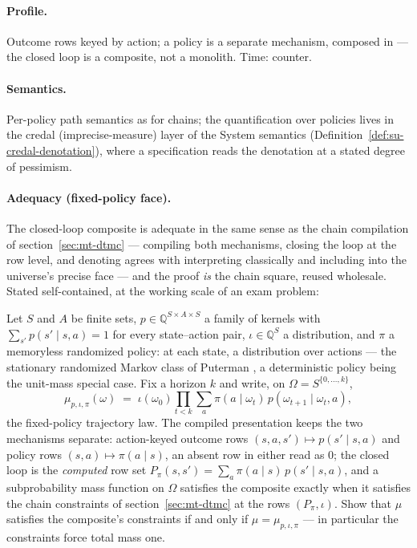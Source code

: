\paragraph{Profile.} Outcome rows keyed by action; a policy is a
separate mechanism, composed in --- the closed loop is a composite,
not a monolith. Time: counter.

\paragraph{Semantics.} Per-policy path semantics as for chains; the
quantification over policies lives in the credal (imprecise-measure)
layer of the System semantics
(Definition~\ref{def:su-credal-denotation}), where a specification
reads the denotation at a stated degree of pessimism.

\paragraph{Adequacy (fixed-policy face).} The closed-loop composite
is adequate in the same sense as the chain compilation of
section~\ref{sec:mt-dtmc} --- compiling both mechanisms, closing the
loop at the row level, and denoting agrees with interpreting
classically and including into the universe's precise face --- and
the proof \emph{is} the chain square, reused wholesale.  Stated
self-contained, at the working scale of an exam problem:

\begin{problem}
\label{prob:mt-mdp}
Let $S$ and $A$ be finite sets, $p \in
\mathbb{Q}^{S \times A \times S}$ a family of kernels with $\sum_{s'}
p(s' \mid s, a) = 1$ for every state--action pair, $\iota \in
\mathbb{Q}^S$ a distribution, and $\pi$ a memoryless randomized
policy: at each state, a distribution over actions --- the stationary
randomized Markov class of Puterman \cite{puterman-1994}, a
deterministic policy being the unit-mass special case.  Fix a horizon
$k$ and write, on $\Omega = S^{\{0,\dots,k\}}$,
\[
  \mu_{p,\iota,\pi}(\omega) \;=\; \iota(\omega_0) \prod_{t < k}
  \sum_{a} \pi(a \mid \omega_t)\, p(\omega_{t+1} \mid \omega_t, a),
\]
the fixed-policy trajectory law.  The compiled presentation keeps the
two mechanisms separate: action-keyed outcome rows $(s, a, s')
\mapsto p(s' \mid s, a)$ and policy rows $(s, a) \mapsto \pi(a \mid
s)$, an absent row in either read as $0$; the closed loop is the
\emph{computed} row set $P_\pi(s, s') = \sum_a \pi(a \mid s)\,
p(s' \mid s, a)$, and a subprobability mass function on $\Omega$
satisfies the composite exactly when it satisfies the chain
constraints of section~\ref{sec:mt-dtmc} at the rows $(P_\pi,
\iota)$.  Show that $\mu$ satisfies the composite's constraints if
and only if $\mu = \mu_{p,\iota,\pi}$ --- in particular the
constraints force total mass one.
\end{problem}

